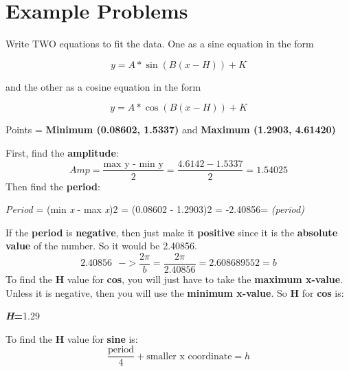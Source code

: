 \documentclass{article}
\begin{document}
\section{Example Problems} %
\begin{tcolorbox}[
  colback=Magenta!5!white,
  colframe=Magenta!75!black,
  title={\centering Example 1 \textbf{(Creating Sine and Cosine Equations)}}]
\begin{center}
    Write TWO equations to fit the data. One as a sine equation in the form
\end{center}
\begin{displaymath}
    y=A*\sin(B(x-H))+K
\end{displaymath}
\begin{center}
    and the other as a cosine equation in the form
\end{center}
\begin{displaymath}
    y=A*\cos(B(x-H))+K
\end{displaymath}
\begin{center}
    Points = \textbf{Minimum (0.08602, 1.5337)}
    and
    \textbf{Maximum (1.2903, 4.61420)}
\end{center}
\end{tcolorbox}
\hfill \break First, find the \textbf{amplitude}:
\[
    Amp=\frac{\text{max y - min y}}{2}=\frac{4.6142-1.5337}{2}=1.54025
  \]
Then find the \textbf{period}:
\begin{center}
    \textit{Period} = (min \textit{x} - max \textit{x})2 = (0.08602 - 1.2903)2 = -2.40856=\textit{ (period)}
\end{center}
If the \textbf{period} is \textbf{negative}, then just make it \textbf{positive} since it is the \textbf{absolute value} of the number. So it would be 2.40856.
\hfill \break
\begin{displaymath}
    2.40856\text{ }->\frac{2\pi}{\textit{b}}=\frac{2\pi}{2.40856}=2.608689552=\textit{b}
\end{displaymath}
\hfill \break
To find the \textbf{H} value for \textbf{cos}, you will just have to take the \textbf{maximum x-value}. Unless it is negative, then you will use the \textbf{minimum x-value}.
\hfill \break
So \textbf{H} for \textbf{cos} is:
\begin{center}
    \textbf{\textit{H}=}1.29
\end{center}
\hfill \break
To find the \textbf{H} value for \textbf{sine} is:
\hfill \break
\begin{displaymath}
    \frac{\text{period}}{4}+\text{smaller x coordinate}=h
\end{displaymath}
\end{document}
